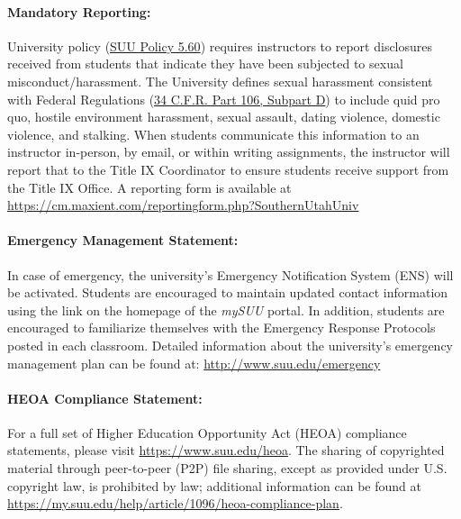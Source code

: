 \documentclass[12pt, letterpaper]{article}
\begin{document}
\paragraph{Mandatory Reporting:}
University policy (\href{https://www.suu.edu/policies/05/60.html}{SUU Policy 5.60}) requires instructors to report disclosures received from students that indicate they have been subjected to sexual misconduct/harassment. The University defines sexual harassment consistent with Federal Regulations (\href{https://www.ecfr.gov/current/title-34/subtitle-B/chapter-I/part-106/subpart-D}{34 C.F.R. Part 106, Subpart D}) to include quid pro quo, hostile environment harassment, sexual assault, dating violence, domestic violence, and stalking. When students communicate this information to an instructor in-person, by email, or within writing assignments, the instructor will report that to the Title IX Coordinator to ensure students receive support from the Title IX Office. A reporting form is available at \href{https://cm.maxient.com/reportingform.php?SouthernUtahUniv}{https://cm.maxient.com/reportingform.php?SouthernUtahUniv}

\paragraph{Emergency Management Statement:}
In case of emergency, the university's Emergency Notification System (ENS) will be activated. Students are encouraged to maintain updated contact information using the link on the homepage of the \emph{mySUU} portal. In addition, students are encouraged to familiarize themselves with the Emergency Response Protocols posted in each classroom. Detailed information about the university's emergency management plan can be found at: \href{http://www.suu.edu/emergency}{http://www.suu.edu/emergency}

\paragraph{HEOA Compliance Statement:}
For a full set of Higher Education Opportunity Act (HEOA) compliance statements, please visit \href{https://www.suu.edu/heoa}{https://www.suu.edu/heoa}. The sharing of copyrighted material through peer-to-peer (P2P) file sharing, except as provided under U.S. copyright law, is prohibited by law; additional information can be found at \newline\href{https://my.suu.edu/help/article/1096/heoa-compliance-plan}{https://my.suu.edu/help/article/1096/heoa-compliance-plan}.
\end{document}
